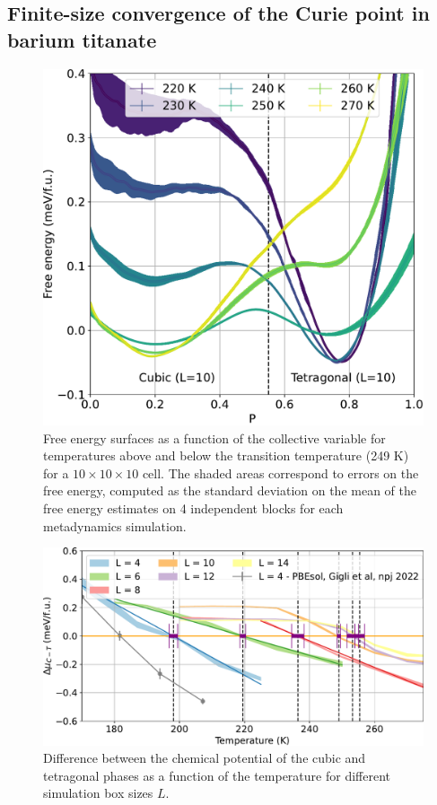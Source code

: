 \subsection{Finite-size convergence of the Curie point in barium titanate}

\begin{figure}
    \centering
    \includegraphics[width=0.7\linewidth]{fig/Free-energy_vs_P_101010.pdf}
    \caption{Free energy surfaces as a function of the collective variable for temperatures above and below the transition temperature (249 K) for a $10\times10\times10$ cell. The shaded areas correspond to errors on the free energy, computed as the standard deviation on the mean of the free energy estimates on 4 independent blocks for each metadynamics simulation.}
    \label{fig:1D-free-energy}
\end{figure}

\begin{figure}
    \centering
    \includegraphics[width=0.8\linewidth]{fig/Size-scaling-deltamu.pdf}
    \caption{Difference between the chemical potential of the cubic and tetragonal phases as a function of the temperature for different simulation box sizes $L$.}
    \label{fig:size-scaling-delta-mu}
\end{figure}

